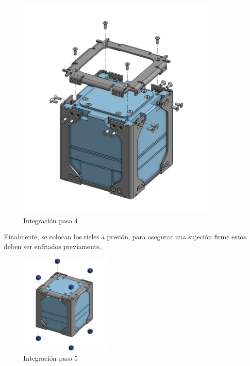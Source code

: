 \begin{figure}[H]
\begin{minipage}{0.49\textwidth}
          \includegraphics[width=0.9\textwidth]{image/structure/integracion4.png}
          \caption{Integración paso 4}
          \label{fig:integracion4}
        \end{minipage}
      \end{figure}

      Finalmente, se colocan los rieles a presión, para asegurar una sujeción firme
      estos deben ser enfriados previamente.
      \begin{figure}[H]
        \centering
        \includegraphics[width=0.4\textwidth]{image/structure/integracion5.png}
        \caption{Integración paso 5}
        \label{fig:integracion5}
      \end{figure}

